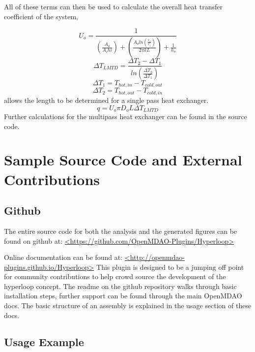 \documentclass[heading.tex]{subfiles}
\begin{document}
All of these terms can then be used to calculate the overall heat transfer coefficient of the system,

\begin{equation*}
U_{o} = \frac{1} {(\frac{A_{o}}{A_{i}h{i}}) + (\frac{A_{o}ln(\frac{r_{o}}{r_{i}})}{2 \pi k L}) + \frac{1}{h_{o}}}
\end{equation*}
\begin{equation*}
\Delta {T}_{LMTD} = \frac{\Delta {T}_{2}-\Delta {T}_{1}}{ln(\frac{\Delta {T}_{2}}{\Delta {T}_{1}})}
\end{equation*}
\begin{equation*}
\Delta {T}_{1} = T_{hot,in} - T_{cold,out}
\end{equation*}
\begin{equation*}
\Delta {T}_{2} = T_{hot,out} - T_{cold,in}
\end{equation*}
allows the length to be determined for a single pass heat exchanger.
\begin{equation*}
q = U_{o} \pi D_{o} L \Delta {T}_{LMTD}
\end{equation*}
Further calculations for the multipass heat exchanger can be found in the source code.

\section{Sample Source Code and External Contributions} \label{app:Github}  

\subsection{Github}

The entire source code for both the analysis and the generated figures can be found on github at:
\url{<https://github.com/OpenMDAO-Plugins/Hyperloop>}

Online documentation can be found at:
\url{<http://openmdao-plugins.github.io/Hyperloop>}
This plugin is designed to be a jumping off point for community contributions to help crowd source the development of the hyperloop
concept. The readme on the github repository walks through basic installation steps, further support can be found through the main
OpenMDAO docs. The basic structure of an assembly is explained in the usage section of these docs.

\subsection{Usage Example}
\end{document}
